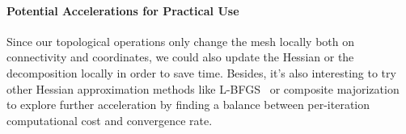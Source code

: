 \paragraph{Potential Accelerations for Practical Use}
Since our topological operations only change the mesh locally both on connectivity and coordinates, we could also update the Hessian or the decomposition locally in order to save time. Besides, it's also interesting to try other Hessian approximation methods like L-BFGS~\cite{Liu1989Limited} or composite majorization~\cite{Shtengel2017Geometric} to explore further acceleration by finding a balance between per-iteration computational cost and convergence rate.

